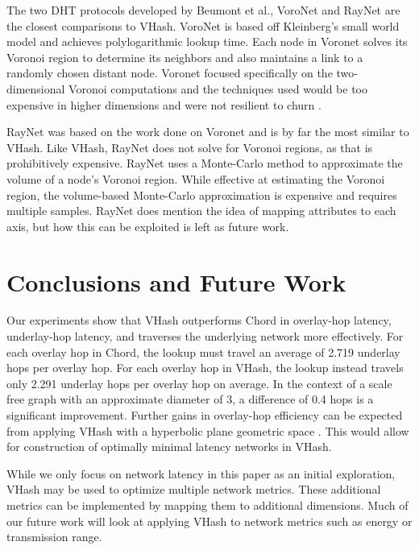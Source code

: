\documentclass[10pt, conference, letterpaper]{IEEEtran}
\begin{document}
The two DHT protocols developed by Beumont et al., VoroNet \cite{voronet} and RayNet \cite{raynet} are the closest comparisons to VHash.
VoroNet is based off Kleinberg's small world model \cite{kleinberg2000navigation} and achieves polylogarithmic lookup time.  
Each node in Voronet solves its Voronoi region to determine its neighbors and also maintains a link to a randomly chosen distant node.
Voronet focused specifically on the two-dimensional Voronoi computations and the techniques used would be too expensive in higher dimensions and were not resilient to churn  \cite{raynet}.

RayNet \cite{raynet} was based on the work done on Voronet and is by far the most similar to VHash.  
Like VHash, RayNet does not solve for Voronoi regions, as that is prohibitively expensive.  
RayNet uses a Monte-Carlo method to approximate the volume of a node's Voronoi region.  
While effective at estimating the Voronoi region,  the volume-based Monte-Carlo approximation is expensive and requires multiple samples. 
RayNet does mention the idea of mapping attributes to each axis, but how this can be exploited is left as future work.
 

\section{Conclusions and Future Work}
\label{conclusions}
Our experiments show that VHash outperforms Chord in overlay-hop latency, underlay-hop latency, and traverses the underlying network more effectively. 
For each overlay hop in Chord, the lookup must travel an average of 2.719 underlay hops per overlay hop.
For each overlay hop in VHash, the lookup instead travels only 2.291 underlay hops per overlay hop on average.
In the context of a scale free graph with an approximate diameter of 3, a difference of 0.4 hops is a significant improvement. 
Further gains in overlay-hop efficiency can be expected from applying VHash with a hyperbolic plane geometric space \cite{papadopoulos2010greedy}.
This would allow for construction of optimally minimal latency networks in VHash.

While we only focus on network latency in this paper as an initial exploration, VHash may be used to optimize multiple network metrics.
These additional metrics can be implemented by mapping them to additional dimensions.
Much of our future work will look at applying VHash to network metrics such as energy or transmission range.
 
\end{document}
